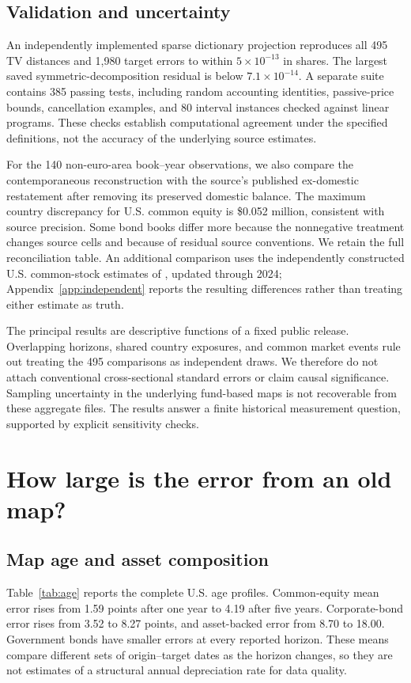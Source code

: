 \documentclass[11pt,a4paper]{article}
\begin{document}
\subsection{Validation and uncertainty}
An independently implemented sparse dictionary projection reproduces all 495 TV distances and 1,980 target errors to within $5\times10^{-13}$ in shares. The largest saved symmetric-decomposition residual is below $7.1\times10^{-14}$. A separate suite contains 385 passing tests, including random accounting identities, passive-price bounds, cancellation examples, and 80 interval instances checked against linear programs. These checks establish computational agreement under the specified definitions, not the accuracy of the underlying source estimates.

For the 140 non-euro-area book--year observations, we also compare the contemporaneous reconstruction with the source's published ex-domestic restatement after removing its preserved domestic balance. The maximum country discrepancy for U.S. common equity is \$0.052 million, consistent with source precision. Some bond books differ more because the nonnegative treatment changes source cells and because of residual source conventions. We retain the full reconciliation table. An additional comparison uses the independently constructed U.S. common-stock estimates of \citet{bbc}, updated through 2024; Appendix~\ref{app:independent} reports the resulting differences rather than treating either estimate as truth.

The principal results are descriptive functions of a fixed public release. Overlapping horizons, shared country exposures, and common market events rule out treating the 495 comparisons as independent draws. We therefore do not attach conventional cross-sectional standard errors or claim causal significance. Sampling uncertainty in the underlying fund-based maps is not recoverable from these aggregate files. The results answer a finite historical measurement question, supported by explicit sensitivity checks.

\section{How large is the error from an old map?}
\subsection{Map age and asset composition}
Table~\ref{tab:age} reports the complete U.S. age profiles. Common-equity mean error rises from 1.59 points after one year to 4.19 after five years. Corporate-bond error rises from 3.52 to 8.27 points, and asset-backed error from 8.70 to 18.00. Government bonds have smaller errors at every reported horizon. These means compare different sets of origin--target dates as the horizon changes, so they are not estimates of a structural annual depreciation rate for data quality.
\end{document}
